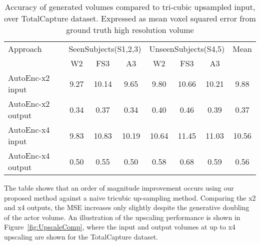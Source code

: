 \documentclass[runningheads]{llncs}
\begin{document}
\begin{table}[htb]
\centering
{
\small
\begin{tabular}{lccccccc}
\hline
Approach                     &\multicolumn{3}{c}{SeenSubjects(S1,2,3)}&\multicolumn{3}{c}{UnseenSubjects(S4,5)} & Mean \\
                             & W2 & FS3 & A3 & W2 & FS3 & A3 & \\ \hline
AutoEnc-x2 input    &9.27 & 10.14 & 9.65 & 9.80 & 10.66 & 10.21 & 9.88\\ 
AutoEnc-x2 output    &0.34 & 0.37 & 0.34 & 0.40 & 0.46 & 0.39 & 0.37\\
AutoEnc-x4 input    &9.83 & 10.83 & 10.19 & 10.64 & 11.45 & 11.03 & 10.56\\ 
AutoEnc-x4 output    &0.50 & 0.55 & 0.50 & 0.58 & 0.68 & 0.59 & 0.56\\ \hline
\end{tabular}
}
\caption{Accuracy of generated volumes compared to tri-cubic upsampled input, over TotalCapture dataset. Expressed as mean voxel squared error  from ground truth high resolution volume}
\label{tab:totalcapturePVHResults}
\squeezeup
\squeezeup
\end{table}
The table shows that an order of magnitude improvement occurs using our proposed method against a naive tricubic up-sampling method. Comparing the x2 and x4 outputs, the MSE increases only slightly despite the generative doubling of the actor volume. An illustration of the upscaling performance is shown in Figure~\ref{fig:UpscaleComp}, where the input and output volumes at up to x4 upscaling are shown for the TotalCapture dataset.
\end{document}
